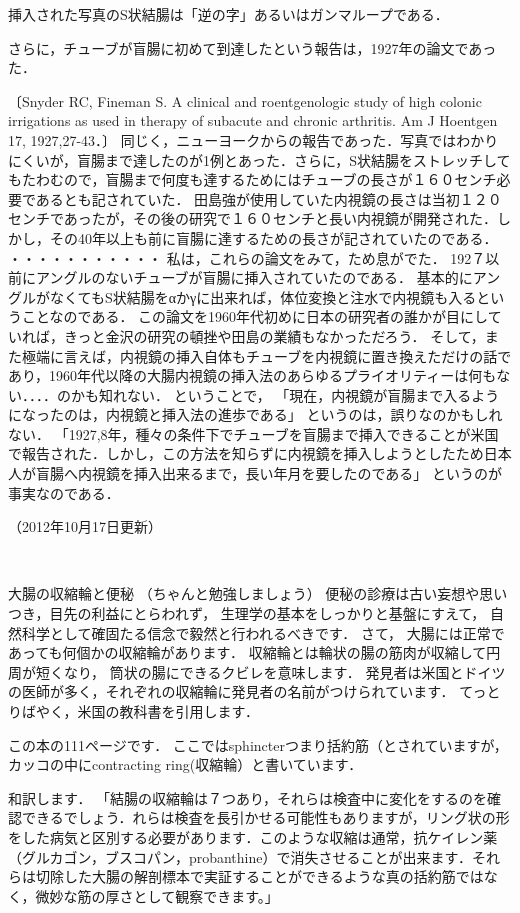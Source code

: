 挿入された写真のS状結腸は「逆の字」あるいはガンマループである．

さらに，チューブが盲腸に初めて到達したという報告は，1927年の論文であった．

〔Snyder RC, Fineman S. A clinical and roentgenologic study of high colonic irrigations as used in therapy of subacute and chronic arthritis. Am J Hoentgen 17, 1927,27-43．〕
同じく，ニューヨークからの報告であった．写真ではわかりにくいが，盲腸まで達したのが1例とあった．さらに，S状結腸をストレッチしてもたわむので，盲腸まで何度も達するためにはチューブの長さが１６０センチ必要であるとも記されていた．
田島強が使用していた内視鏡の長さは当初１２０センチであったが，その後の研究で１６０センチと長い内視鏡が開発された．しかし，その40年以上も前に盲腸に達するための長さが記されていたのである．
・・・・・・・・・・・
私は，これらの論文をみて，ため息がでた．
192７以前にアングルのないチューブが盲腸に挿入されていたのである．
基本的にアングルがなくてもS状結腸をαかγに出来れば，体位変換と注水で内視鏡も入るということなのである．
この論文を1960年代初めに日本の研究者の誰かが目にしていれば，きっと金沢の研究の頓挫や田島の業績もなかっただろう．
そして，また極端に言えば，内視鏡の挿入自体もチューブを内視鏡に置き換えただけの話であり，1960年代以降の大腸内視鏡の挿入法のあらゆるプライオリティーは何もない．．．．のかも知れない．
ということで，
「現在，内視鏡が盲腸まで入るようになったのは，内視鏡と挿入法の進歩である」
というのは，誤りなのかもしれない．
「1927,8年，種々の条件下でチューブを盲腸まで挿入できることが米国で報告された．しかし，この方法を知らずに内視鏡を挿入しようとしたため日本人が盲腸へ内視鏡を挿入出来るまで，長い年月を要したのである」
というのが事実なのである．

（2012年10月17日更新）


 		　 

大腸の収縮輪と便秘
（ちゃんと勉強しましょう） 
便秘の診療は古い妄想や思いつき，目先の利益にとらわれず，
生理学の基本をしっかりと基盤にすえて，
自然科学として確固たる信念で毅然と行われるべきです．
さて，
大腸には正常であっても何個かの収縮輪があります．
収縮輪とは輪状の腸の筋肉が収縮して円周が短くなり，
筒状の腸にできるクビレを意味します．
発見者は米国とドイツの医師が多く，それぞれの収縮輪に発見者の名前がつけられています．
てっとりばやく，米国の教科書を引用します． 

この本の111ページです．
ここではsphincterつまり括約筋（とされていますが，カッコの中にcontracting ring(収縮輪）と書いています．

和訳します．
「結腸の収縮輪は７つあり，それらは検査中に変化をするのを確認できるでしょう．れらは検査を長引かせる可能性もありますが，リング状の形をした病気と区別する必要があります．このような収縮は通常，抗ケイレン薬（グルカゴン，ブスコパン，probanthine）で消失させることが出来ます．それらは切除した大腸の解剖標本で実証することができるような真の括約筋ではなく，微妙な筋の厚さとして観察できます。」

